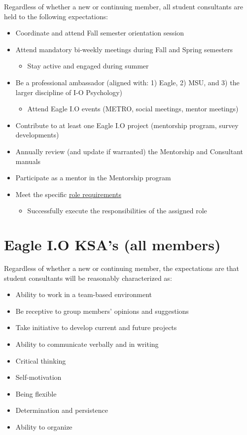 \documentclass[
]{book}
\providecommand{\tightlist}{%
  \setlength{\itemsep}{0pt}\setlength{\parskip}{0pt}}
\begin{document}
Regardless of whether a new or continuing member, all student consultants are held to the following expectations:

\begin{itemize}
\tightlist
\item
  Coordinate and attend Fall semester orientation session
\item
  Attend mandatory bi-weekly meetings during Fall and Spring semesters

  \begin{itemize}
  \tightlist
  \item
    Stay active and engaged during summer
  \end{itemize}
\item
  Be a professional ambassador (aligned with: 1) Eagle, 2) MSU, and 3) the larger discipline of I-O Psychology)

  \begin{itemize}
  \tightlist
  \item
    Attend Eagle I.O events (METRO, social meetings, mentor meetings)
  \end{itemize}
\item
  Contribute to at least one Eagle I.O project (mentorship program, survey developments)
\item
  Annually review (and update if warranted) the Mentorship and Consultant manuals
\item
  Participate as a mentor in the Mentorship program
\item
  Meet the specific \protect\hyperlink{roles}{role requirements}

  \begin{itemize}
  \tightlist
  \item
    Successfully execute the responsibilities of the assigned role
  \end{itemize}
\end{itemize}

\hypertarget{eagle-i.o-ksas-all-members}{%
\section{Eagle I.O KSA's (all members)}\label{eagle-i.o-ksas-all-members}}

Regardless of whether a new or continuing member, the expectations are that student consultants will be reasonably characterized as:

\begin{itemize}
\tightlist
\item
  Ability to work in a team-based environment
\item
  Be receptive to group members' opinions and suggestions
\item
  Take initiative to develop current and future projects
\item
  Ability to communicate verbally and in writing
\item
  Critical thinking
\item
  Self-motivation
\item
  Being flexible
\item
  Determination and persistence
\item
  Ability to organize
\end{itemize}
\end{document}
